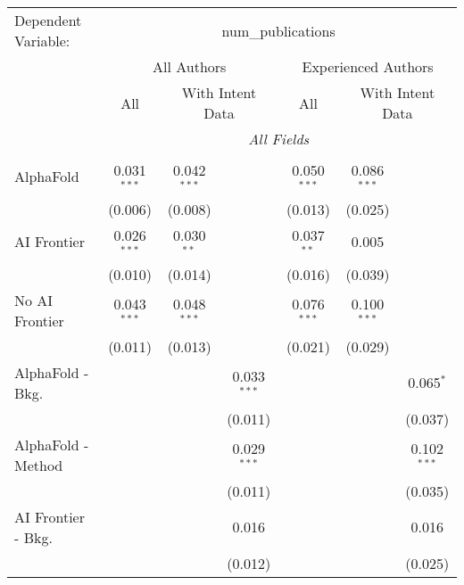 \begingroup
\centering
\begin{tabular}{lcccccc}
   \tabularnewline \midrule \midrule
   Dependent Variable: & \multicolumn{6}{c}{num\_publications}\\
 & \multicolumn{3}{c}{All Authors} & \multicolumn{3}{c}{Experienced Authors} \\
\cmidrule(lr){2-4} \cmidrule(lr){5-7}
 & \multicolumn{1}{c}{All} & \multicolumn{2}{c}{With Intent Data} & \multicolumn{1}{c}{All} & \multicolumn{2}{c}{With Intent Data} \\
\cmidrule(lr){2-2} \cmidrule(lr){3-4} \cmidrule(lr){5-5} \cmidrule(lr){6-7}
 & \multicolumn{6}{c}{\textit{All Fields}} \\ \\
   AlphaFold               & 0.031$^{***}$ & 0.042$^{***}$ &               & 0.050$^{***}$ & 0.086$^{***}$ &   \\   
                           & (0.006)       & (0.008)       &               & (0.013)       & (0.025)       &   \\   
   AI Frontier             & 0.026$^{***}$ & 0.030$^{**}$  &               & 0.037$^{**}$  & 0.005         &   \\   
                           & (0.010)       & (0.014)       &               & (0.016)       & (0.039)       &   \\   
   No AI Frontier          & 0.043$^{***}$ & 0.048$^{***}$ &               & 0.076$^{***}$ & 0.100$^{***}$ &   \\   
                           & (0.011)       & (0.013)       &               & (0.021)       & (0.029)       &   \\   
   AlphaFold - Bkg.        &               &               & 0.033$^{***}$ &               &               & 0.065$^{*}$\\   
                           &               &               & (0.011)       &               &               & (0.037)\\   
   AlphaFold - Method      &               &               & 0.029$^{***}$ &               &               & 0.102$^{***}$\\   
                           &               &               & (0.011)       &               &               & (0.035)\\   
   AI Frontier - Bkg.      &               &               & 0.016         &               &               & 0.016\\   
                           &               &               & (0.012)       &               &               & (0.025)\\   

\end{tabular}
